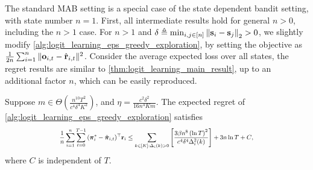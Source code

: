 The standard MAB setting is a special case of the state dependent bandit setting, with state number $n = 1$. First, all intermediate results hold for general $n > 0$, including the $n > 1$ case. For $n > 1$ and $\delta \triangleq \min_{i, j \in [n]}{\left\| {\mathbf{s}}_i - {\mathbf{s}}_j \right\|_2} > 0$, we slightly modify \cref{alg:logit_learning_eps_greedy_exploration}, by setting the objective as $\frac{1}{2n}\sum_{i=1}^{n}{ \| {\mathbf{o}}_{i, t} - \hat{{\mathbf{r}}}_{i,t} \|^2}$. Consider the average expected loss over all states, the regret results are similar to \cref{thm:logit_learning_main_result}, up to an additional factor $n$, which can be easily reproduced.
\begin{thm}
\label{thm:many_state_dependent_bandit_setting}
     Suppose $m \in \Theta\left( \frac{n^{10} T^2}{c^4 \delta^4 K^2} \right)$, and $\eta = \frac{c^2 \delta^2}{16 n^4 K m}$. The expected regret of \cref{alg:logit_learning_eps_greedy_exploration} satisfies
\begin{equation*}
\scalemath{0.75}{
	\frac{1}{n } \sum\limits_{i=1}^{n}{ \sum\limits_{t=0}^{T-1}{ ( {\rvpi_i^*} - \tilde{\rvpi}_{i, t})^\top \rvr_i  } \le \sum\limits_{k \in [K] : \Delta_i(k) > 0}{ \left[ \frac{ 3 \beta n^8 \left( \ln{T} \right)^2}{c^4 \delta^4 \Delta_i^2(k)} \right] } + 3 n \ln{T} + C },
}
\end{equation*}
where $C$ is independent of $T$.
\end{thm}


